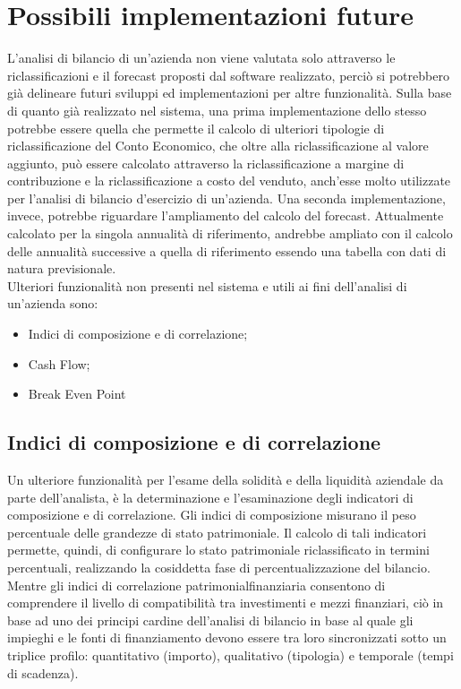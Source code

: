 
\chapter{Possibili implementazioni future}

L'analisi di bilancio di un'azienda non viene valutata solo attraverso le riclassificazioni e il forecast proposti dal software realizzato, perciò si potrebbero già delineare futuri sviluppi ed implementazioni per altre funzionalità.
Sulla base di quanto già realizzato nel sistema, una prima implementazione dello stesso potrebbe essere quella che permette il calcolo di ulteriori tipologie di riclassificazione del Conto Economico, che oltre alla riclassificazione al valore aggiunto, può essere calcolato attraverso la riclassificazione a margine di contribuzione e la riclassificazione a costo del venduto, anch'esse molto utilizzate per l'analisi di bilancio d'esercizio di un'azienda. Una seconda implementazione, invece, potrebbe riguardare l'ampliamento del calcolo del forecast. Attualmente calcolato per la singola annualità di riferimento, andrebbe ampliato con il calcolo delle annualità successive a quella di riferimento essendo una tabella con dati di natura previsionale. \\
Ulteriori funzionalità non presenti nel sistema e utili ai fini dell'analisi di un'azienda sono:

\begin{itemize}
 \item Indici di composizione e di correlazione;
 \item Cash Flow;
 \item Break Even Point
\end{itemize}



\section{Indici di composizione e di correlazione}

Un ulteriore funzionalità per l'esame della solidità e della liquidità aziendale da parte dell'analista, è la determinazione e l'esaminazione degli indicatori di composizione e di correlazione.
Gli indici di composizione misurano il peso percentuale delle grandezze di stato patrimoniale. Il calcolo di tali indicatori permette, quindi, di configurare lo stato patrimoniale riclassificato in termini percentuali, realizzando la cosiddetta fase di percentualizzazione del bilancio.
Mentre gli indici di correlazione patrimonialfinanziaria consentono di comprendere il livello di compatibilità tra investimenti e mezzi finanziari, ciò in base ad uno dei principi cardine dell'analisi di bilancio in base al quale gli impieghi e le fonti di finanziamento devono essere tra loro sincronizzati sotto un triplice profilo: quantitativo (importo), qualitativo (tipologia) e temporale (tempi di scadenza). \\


